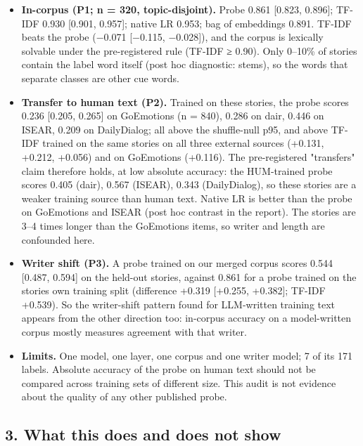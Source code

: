 \documentclass[
  10pt,
]{article}
\providecommand{\tightlist}{%
  \setlength{\itemsep}{0pt}\setlength{\parskip}{0pt}}
\begin{document}
\begin{itemize}
\tightlist
\item
  \textbf{In-corpus (P1; n = 320, topic-disjoint).} Probe 0.861
  {[}0.823, 0.896{]}; TF-IDF 0.930 {[}0.901, 0.957{]}; native LR 0.953;
  bag of embeddings 0.891. TF-IDF beats the probe (−0.071 {[}−0.115,
  −0.028{]}), and the corpus is lexically solvable under the
  pre-registered rule (TF-IDF ≥ 0.90). Only 0--10\% of stories contain
  the label word itself (post hoc diagnostic: stems), so the words that
  separate classes are other cue words.
\item
  \textbf{Transfer to human text (P2).} Trained on these stories, the
  probe scores 0.236 {[}0.205, 0.265{]} on GoEmotions (n = 840), 0.286
  on dair, 0.446 on ISEAR, 0.209 on DailyDialog; all above the
  shuffle-null p95, and above TF-IDF trained on the same stories on all
  three external sources (+0.131, +0.212, +0.056) and on GoEmotions
  (+0.116). The pre-registered "transfers" claim therefore holds, at low
  absolute accuracy: the HUM-trained probe scores 0.405 (dair), 0.567
  (ISEAR), 0.343 (DailyDialog), so these stories are a weaker training
  source than human text. Native LR is better than the probe on
  GoEmotions and ISEAR (post hoc contrast in the report). The stories
  are 3--4 times longer than the GoEmotions items, so writer and length
  are confounded here.
\item
  \textbf{Writer shift (P3).} A probe trained on our merged corpus
  scores 0.544 {[}0.487, 0.594{]} on the held-out stories, against 0.861
  for a probe trained on the stories\textquotesingle{} own training
  split (difference +0.319 {[}+0.255, +0.382{]}; TF-IDF +0.539). So the
  writer-shift pattern found for LLM-written training text appears from
  the other direction too: in-corpus accuracy on a model-written corpus
  mostly measures agreement with that writer.
\item
  \textbf{Limits.} One model, one layer, one corpus and one writer
  model; 7 of its 171 labels. Absolute accuracy of the probe on human
  text should not be compared across training sets of different size.
  This audit is not evidence about the quality of any other published
  probe.
\end{itemize}

\subsection{3. What this does and does not
show}\label{3-what-this-does-and-does-not-show}
\end{document}
